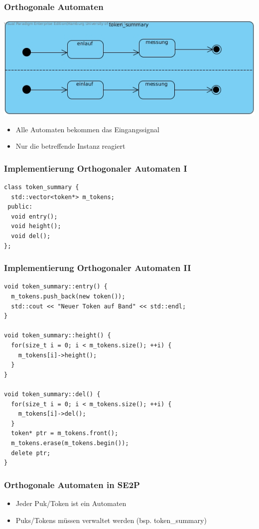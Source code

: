 \documentclass{beamer}
\begin{document}
\begin{frame}
 \frametitle{Orthogonale Automaten}
 \begin{center}
 \includegraphics[scale=.5]{img/Orthogonal.jpg}
 \end{center}
 \begin{itemize}
  \item Alle Automaten bekommen das Eingangssignal
  \item Nur die betreffende Instanz reagiert
 \end{itemize}
\end{frame}

\begin{frame}[fragile]
 \frametitle{Implementierung Orthogonaler Automaten I}
 \begin{lstlisting}
class token_summary {
  std::vector<token*> m_tokens;
 public:
  void entry();
  void height();
  void del();
};
 \end{lstlisting}
\end{frame}

\begin{frame}[fragile]
 \frametitle{Implementierung Orthogonaler Automaten II}
 \begin{lstlisting}
void token_summary::entry() {
  m_tokens.push_back(new token());
  std::cout << "Neuer Token auf Band" << std::endl;
}

void token_summary::height() {
  for(size_t i = 0; i < m_tokens.size(); ++i) {
    m_tokens[i]->height();
  }
}

void token_summary::del() {
  for(size_t i = 0; i < m_tokens.size(); ++i) {
    m_tokens[i]->del();
  }
  token* ptr = m_tokens.front();
  m_tokens.erase(m_tokens.begin());
  delete ptr;
}
 \end{lstlisting}
\end{frame}

\begin{frame}
 \frametitle{Orthogonale Automaten in SE2P}
 \begin{itemize}
  \item Jeder Puk/Token ist ein Automaten
  \item Puks/Tokens m\"ussen verwaltet werden (bsp. token\_summary)
 \end{itemize}
\end{frame}
\end{document}

